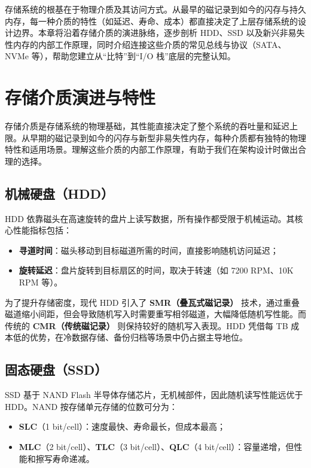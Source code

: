 \documentclass[12pt,UTF8]{ctexbook}
\begin{document}
存储系统的根基在于物理介质及其访问方式。从最早的磁记录到如今的闪存与持久内存，每一种介质的特性（如延迟、寿命、成本）都直接决定了上层存储系统的设计边界。本章将沿着存储介质的演进脉络，逐步剖析 HDD、SSD 以及新兴非易失性内存的内部工作原理，同时介绍连接这些介质的常见总线与协议（SATA、NVMe 等），帮助您建立从“比特”到“I/O 栈”底层的完整认知。
	
\section{存储介质演进与特性}

存储介质是存储系统的物理基础，其性能直接决定了整个系统的吞吐量和延迟上限。从早期的磁记录到如今的闪存与新型非易失性内存，每种介质都有独特的物理特性和适用场景。理解这些介质的内部工作原理，有助于我们在架构设计时做出合理的选择。

\subsection{机械硬盘（HDD）}

HDD 依靠磁头在高速旋转的盘片上读写数据，所有操作都受限于机械运动。其核心性能指标包括：

\begin{itemize}
\item \textbf{寻道时间}：磁头移动到目标磁道所需的时间，直接影响随机访问延迟；
\item \textbf{旋转延迟}：盘片旋转到目标扇区的时间，取决于转速（如 7200 RPM、10K RPM 等）。
\end{itemize}

为了提升存储密度，现代 HDD 引入了 \textbf{SMR（叠瓦式磁记录）} 技术，通过重叠磁道缩小间距，但会导致随机写入时需要重写相邻磁道，大幅降低随机写性能。而传统的 \textbf{CMR（传统磁记录）} 则保持较好的随机写入表现。HDD 凭借每 TB 成本低的优势，在冷数据存储、备份归档等场景中仍占据主导地位。

\subsection{固态硬盘（SSD）}

SSD 基于 NAND Flash 半导体存储芯片，无机械部件，因此随机读写性能远优于 HDD。NAND 按存储单元存储的位数可分为：

\begin{itemize}
\item \textbf{SLC}（1 bit/cell）：速度最快、寿命最长，但成本最高；
\item \textbf{MLC}（2 bit/cell）、\textbf{TLC}（3 bit/cell）、\textbf{QLC}（4 bit/cell）：容量递增，但性能和擦写寿命递减。
\end{itemize}
\end{document}

